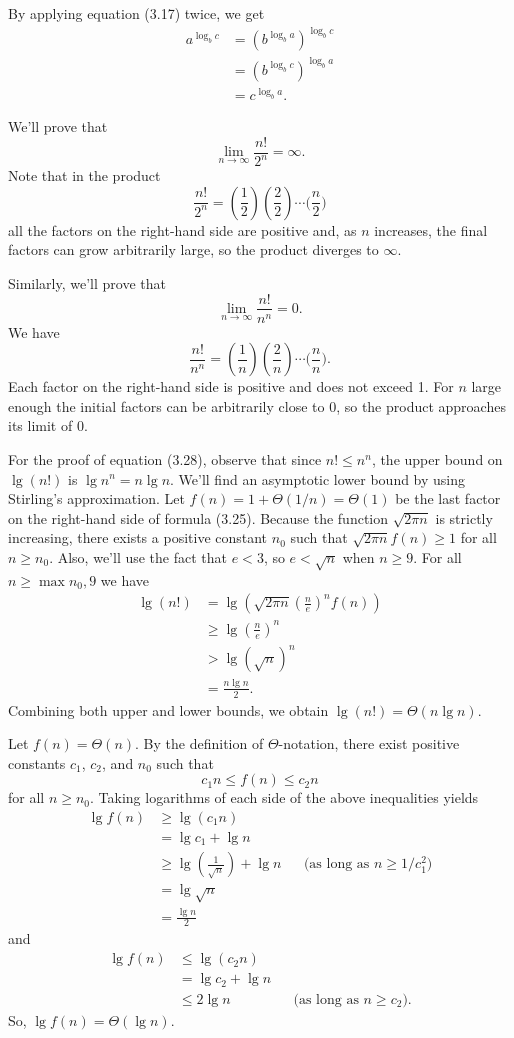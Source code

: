 \subexercise
By applying equation (3.17) twice, we get
\begin{align*}
    a^{\log_bc} &= (b^{\log_ba})^{\log_bc} \\
    &= (b^{\log_bc})^{\log_ba} \\
    &= c^{\log_ba}.
\end{align*}

\subexercise
We'll prove that
\[
    \lim_{n\to\infty}\frac{n!}{2^n} = \infty.
\]
Note that in the product
\[
    \frac{n!}{2^n} = \left(\frac{1}{2}\right)\left(\frac{2}{2}\right)\cdots\biggl(\frac{n}{2}\biggr)
\]
all the factors on the right-hand side are positive and, as $n$ increases, the final factors can grow arbitrarily large, so the product diverges to $\infty$.

Similarly, we'll prove that
\[
    \lim_{n\to\infty}\frac{n!}{n^n} = 0.
\]
We have
\[
    \frac{n!}{n^n} = \left(\frac{1}{n}\right)\left(\frac{2}{n}\right)\cdots\biggl(\frac{n}{n}\biggr).
\]
Each factor on the right-hand side is positive and does not exceed 1.
For $n$ large enough the initial factors can be arbitrarily close to 0, so the product approaches its limit of 0.

For the proof of equation (3.28), observe that since $n!\le n^n$, the upper bound on $\lg(n!)$ is $\lg n^n=n\lg n$.
We'll find an asymptotic lower bound by using Stirling's approximation.
Let $f(n)=1+\Theta(1/n)=\Theta(1)$ be the last factor on the right-hand side of formula (3.25).
Because the function $\sqrt{2\pi n}$ is strictly increasing, there exists a positive constant $n_0$ such that $\sqrt{2\pi n}f(n)\ge1$ for all $n\ge n_0$.
Also, we'll use the fact that $e<3$, so $e<\sqrt{n}$ when $n\ge9$.
For all $n\ge\max{n_0,9}$ we have
\begin{align*}
    \lg(n!) &= \lg\left(\sqrt{2\pi n}\left(\frac{n}{e}\right)^n\!f(n)\right) \\
    &\ge \lg\left(\frac{n}{e}\right)^n \\[1mm]
    &> \lg\left(\sqrt{n}\right)^n \\[1mm]
    &= \frac{n\lg n}{2}.
\end{align*}
Combining both upper and lower bounds, we obtain $\lg(n!)=\Theta(n\lg n)$.

\subexercise
Let $f(n)=\Theta(n)$.
By the definition of $\Theta$-notation, there exist positive constants $c_1$, $c_2$, and $n_0$ such that
\[
    c_1n \le f(n) \le c_2n
\]
for all $n\ge n_0$.
Taking logarithms of each side of the above inequalities yields
\begin{align*}
    \lg f(n) &\ge \lg(c_1n) \\
    &= \lg c_1+\lg n \\
    &\ge \lg\left(\frac{1}{\sqrt{n}}\right)+\lg n && \text{(as long as $n\ge1/c_1^2$)} \\
    &= \lg\sqrt{n} \\
    &= \frac{\lg n}{2}
\end{align*}
and
\begin{align*}
    \lg f(n) &\le \lg(c_2n) \\
    &= \lg c_2+\lg n \\
    &\le 2\lg n && \text{(as long as $n\ge c_2$)}.
\end{align*}
So, $\lg f(n)=\Theta(\lg n)$.
